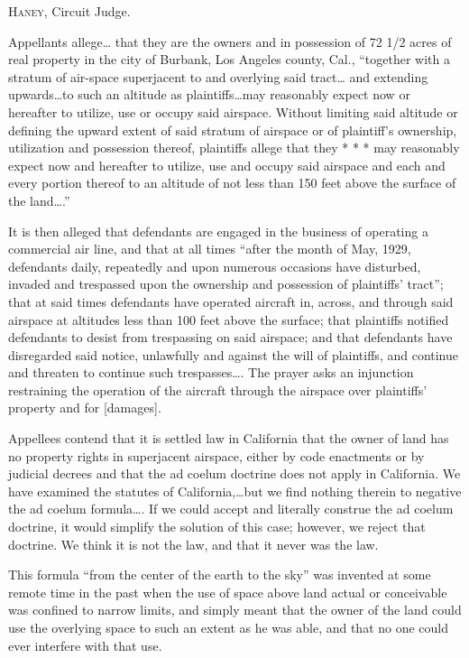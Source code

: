 

\opinion \textsc{Haney}, Circuit Judge.

Appellants allege{\dots} that they are the owners and in possession of 72 1/2
acres of real property in the city of Burbank, Los Angeles county, Cal.,
``together with a stratum of air-space superjacent to and overlying said
tract\ldots
and extending upwards\ldots to such an altitude as plaintiffs\ldots may
reasonably expect now or hereafter to utilize, use or occupy said airspace.
Without limiting said altitude or defining the upward extent of said stratum of
airspace or of plaintiff's ownership, utilization and possession thereof,
plaintiffs allege that they * * * may reasonably expect now and hereafter to
utilize, use and occupy said airspace and each and every portion thereof to an
altitude of not less than 150 feet above the surface of the land\ldots.''

It is then alleged that defendants are engaged in the business of operating a
commercial air line, and that at all times ``after the month of May, 1929,
defendants daily, repeatedly and upon numerous occasions have disturbed,
invaded and trespassed upon the ownership and possession of plaintiffs'
tract''; that at said times defendants have operated aircraft in, across, and
through said airspace at altitudes less than 100 feet above the surface; that
plaintiffs notified defendants to desist from trespassing on said airspace; and
that defendants have disregarded said notice, unlawfully and against the will
of plaintiffs, and continue and threaten to continue such trespasses\dots. 
The prayer asks an injunction restraining the operation of the aircraft through
the airspace over plaintiffs' property and for [damages].

Appellees contend that it is settled law in California that the owner of land
has no property rights in superjacent airspace, either by code enactments or by
judicial decrees and that the ad coelum doctrine does not apply in California.
We have examined the statutes of California,\dots but we find nothing therein
to negative the ad coelum formula\dots. If we could accept and literally
construe the ad coelum doctrine, it would simplify the solution of this case;
however, we reject that doctrine. We think it is not the law, and that it never
was the law.

This formula ``from the center of the earth to the sky'' was invented at some
remote time in the past when the use of space above land actual or conceivable
was confined to narrow limits, and simply meant that the owner of the land
could use the overlying space to such an extent as he was able, and that no one
could ever interfere with that use.

